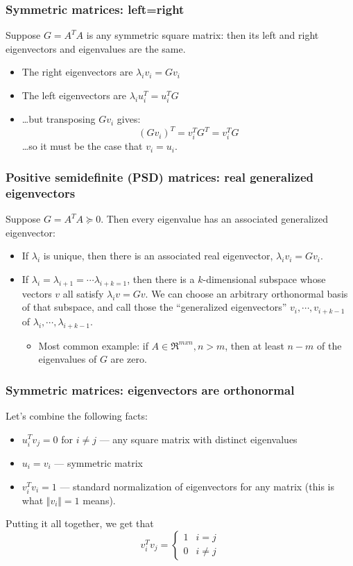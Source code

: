 \documentclass{beamer}
\begin{document}
\begin{frame}
  \frametitle{Symmetric matrices: left=right}

  Suppose $G=A^TA$ is any symmetric square matrix: then its left
  and right eigenvectors and eigenvalues are the same.
  \begin{itemize}
  \item The right eigenvectors are $\lambda_iv_i=G v_i$
  \item The left eigenvectors are $\lambda_i u_i^T = u_i^T G$
  \item \ldots but transposing $G v_i$ gives:
    \[
    (G v_i)^T = v_i^TG^T = v_i^TG
    \]
    \ldots so it must be the case that $v_i=u_i$.
  \end{itemize}
\end{frame}

\begin{frame}
  \frametitle{Positive semidefinite (PSD) matrices: real generalized eigenvectors}

  Suppose $G=A^TA\succeq 0$.  Then every eigenvalue has an
  associated generalized eigenvector:
  \begin{itemize}
  \item If $\lambda_i$ is unique, then there is an associated real
    eigenvector, $\lambda_iv_i = G v_i$.
  \item If $\lambda_i=\lambda_{i+1}=\cdots \lambda_{i+k=1}$, then
    there is a $k$-dimensional subspace whose vectors $v$ all satisfy
    $\lambda_iv =G v$.  We can choose an arbitrary
    orthonormal basis of that subspace, and call those the
    ``generalized eigenvectors'' $v_i,\cdots,v_{i+k-1}$ of
    $\lambda_i,\cdots,\lambda_{i+k-1}$.
    \begin{itemize}
    \item 
      Most common example: if $A\in\Re^{mxn},n>m$, then at least $n-m$
      of the eigenvalues of $G$ are zero.
    \end{itemize}
  \end{itemize}
\end{frame}

\begin{frame}
  \frametitle{Symmetric matrices: eigenvectors are orthonormal}
  Let's combine the following facts:
  \begin{itemize}
  \item ${u}_i^T{v}_j=0$ for $i\ne j$ --- any square matrix with distinct
    eigenvalues
  \item ${u}_i={v}_i$ --- symmetric matrix
  \item ${v}_i^T{v}_i=1$ --- standard normalization of
    eigenvectors for any matrix (this is what $\Vert{v}_i\Vert=1$ means).
  \end{itemize}
  Putting it all together, we get that
  \[
  {v}_i^T{v}_j=
  \begin{cases}
    1&i=j\\
    0&i\ne j
  \end{cases}
  \]
\end{frame}
\end{document}
